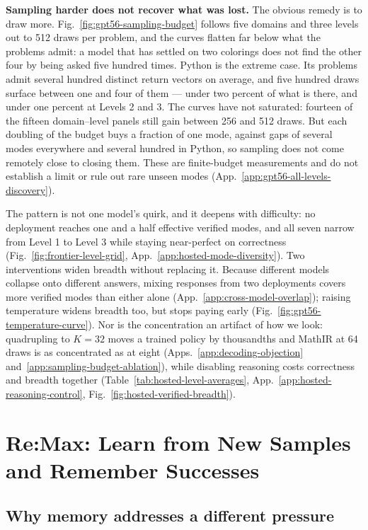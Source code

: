 \documentclass{article}
\newcommand{\1}{\mathbf 1}
\theoremstyle{remark}
\theoremstyle{definition}
\theoremstyle{plain}
\begin{document}
\textbf{Sampling harder does not recover what was lost.}
The obvious remedy is to draw more. Fig.~\ref{fig:gpt56-sampling-budget}
follows five domains and three levels out to 512 draws per problem, and the
curves flatten far below what the problems admit: a model that has settled on
two colorings does not find the other four by being asked five hundred times.
Python is the extreme case. Its problems admit several hundred distinct return
vectors on average, and five hundred draws surface between one and four of
them --- under two percent of what is there, and under one percent at
Levels 2 and 3. The curves have not saturated: fourteen of the fifteen
domain--level panels still gain between 256 and 512 draws. But each doubling of
the budget buys a fraction of one mode, against gaps of several modes
everywhere and several hundred in Python, so sampling does not come remotely
close to closing them. These are finite-budget measurements and do not
establish a limit or rule out rare unseen modes
(App.~\ref{app:gpt56-all-levels-discovery}).


The pattern is not one model's quirk, and it deepens with difficulty: no
deployment reaches one and a half effective verified modes, and all seven narrow
from Level 1 to Level 3 while staying near-perfect on correctness
(Fig.~\ref{fig:frontier-level-grid}, App.~\ref{app:hosted-mode-diversity}). Two interventions widen breadth without
replacing it. Because different models collapse onto different answers, mixing
responses from two deployments covers more verified modes than either alone
(App.~\ref{app:cross-model-overlap}); raising temperature widens breadth too,
but stops paying early (Fig.~\ref{fig:gpt56-temperature-curve}).
Nor is the concentration an artifact of how we look: quadrupling to $K=32$
moves a trained policy by thousandths and MathIR at 64 draws is as concentrated
as at eight (Apps.~\ref{app:decoding-objection}
and~\ref{app:sampling-budget-ablation}), while disabling reasoning costs
correctness and breadth together
(Table~\ref{tab:hosted-level-averages},
App.~\ref{app:hosted-reasoning-control},
Fig.~\ref{fig:hosted-verified-breadth}).

\section{Re:Max: Learn from New Samples and Remember Successes}
\label{sec:method}

\subsection{Why memory addresses a different pressure}
\label{sec:collapse-mechanism}
\end{document}
